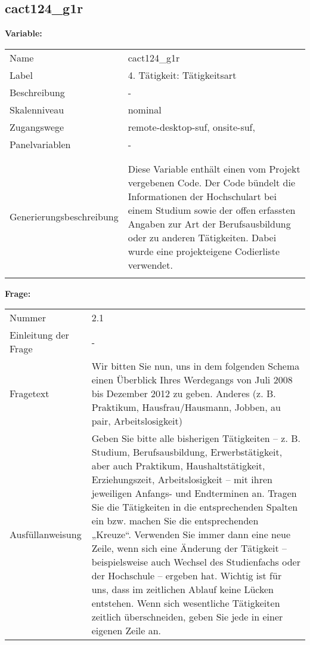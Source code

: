 	
	
	\subsection{cact124\_g1r}
	\label{subSection:cact124_g1r}

	\noindent\textbf{Variable:}\\
		\begin{tabular}{lL{11.3cm}}
			\label{tableVariable:cact124_g1r}
			Name & cact124\_g1r \\
			Label & 4. Tätigkeit: Tätigkeitsart \\
			Beschreibung & - \\
			Skalenniveau & nominal \\
			Zugangswege &
				remote-desktop-suf,
				onsite-suf,
 \\
			Panelvariablen & -
			 \\
			 \\
 \\
					Generierungsbeschreibung & Diese Variable enthält einen vom Projekt vergebenen Code. Der Code bündelt die  Informationen der Hochschulart bei einem Studium sowie der  offen erfassten Angaben zur Art der Berufsausbildung oder zu anderen Tätigkeiten. Dabei wurde eine projekteigene Codierliste verwendet.
				 \\	
			 \\
		\end{tabular}

		\vspace*{1 cm}
		\noindent\textbf{Frage:}\\
		\begin{tabular}{lL{11.3cm}}
			\label{tableQuestion:cact124_g1r}
			Nummer & 2.1 \\
			Einleitung der Frage & - \\
			Fragetext & Wir bitten Sie nun, uns in dem folgenden Schema einen Überblick Ihres Werdegangs von Juli 2008 bis Dezember 2012 zu geben.
Anderes
(z. B. Praktikum, Hausfrau/Hausmann, Jobben, au pair, Arbeitslosigkeit) \\
			Ausfüllanweisung & Geben Sie bitte alle bisherigen Tätigkeiten – z. B. Studium, Berufsausbildung, Erwerbstätigkeit, aber auch Praktikum, Haushaltstätigkeit,
Erziehungszeit, Arbeitslosigkeit – mit ihren jeweiligen Anfangs- und Endterminen an. Tragen Sie die Tätigkeiten in die entsprechenden Spalten ein bzw. machen Sie die entsprechenden „Kreuze“. Verwenden Sie immer dann eine neue Zeile, wenn sich eine Änderung der Tätigkeit – beispielsweise auch Wechsel des Studienfachs oder der Hochschule – ergeben hat. Wichtig ist für uns, dass im zeitlichen Ablauf keine Lücken entstehen. Wenn sich wesentliche Tätigkeiten zeitlich überschneiden, geben Sie jede in einer eigenen Zeile an. \\
		\end{tabular}





